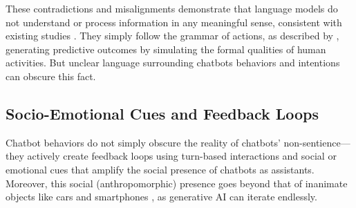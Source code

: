 These contradictions and misalignments demonstrate that language models do not understand or process information in any meaningful sense, consistent with existing studies \citep{bender2020climbing}. They simply follow the grammar of actions, as described by \citet{agre1995computational}, generating predictive outcomes by simulating the formal qualities of human activities. But unclear language surrounding chatbots behaviors and intentions can obscure this fact. 










\subsection{Socio-Emotional Cues and Feedback Loops}

Chatbot behaviors do not simply obscure the reality of chatbots' non-sentience---they actively create feedback loops using turn-based interactions and social or emotional cues that amplify the social presence of chatbots as assistants. Moreover, this social (anthropomorphic) presence goes beyond that of inanimate objects like cars \citep{kuhn2014car} and smartphones \citep{wang2017smartphones}, as generative AI can iterate endlessly. 

